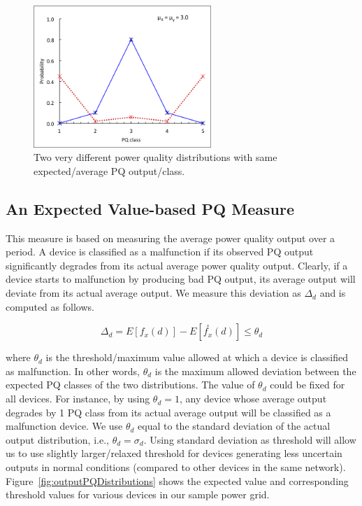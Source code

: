 \begin{figure}[!p]
\centering
\includegraphics[width=0.6\textwidth]{average_pq_exception}
\vspace{1cm}
\caption{Two very different power quality distributions with same expected/average PQ output/class.}
\vspace{2cm}
\label{fig:average_pq_exception}
\end{figure}

\subsection{An Expected Value-based PQ Measure}
This measure is based on measuring the average power quality output over a period. A device is classified as a malfunction if its observed PQ output significantly degrades from its actual average power quality output. Clearly, if a device starts to malfunction by producing bad PQ output, its average output will deviate from its actual average output. We measure this deviation as $\Delta_d$ and is computed as follows.

\[\Delta_d = E[f_x(d)] - E[\overset{\circ}{f_x}(d)] \leq \theta_d \]

\noindent where $\theta_d$ is the threshold/maximum value allowed at which a device is classified as malfunction. In other words, $\theta_d$ is the maximum allowed deviation between the expected PQ classes of the two distributions. The value of $\theta_d$ could be fixed for all devices. For instance, by using $\theta_d = 1$, any device whose average output degrades by 1 PQ class from its actual average output will be classified as a malfunction device. We use $\theta_d$ equal to the standard deviation of the actual output distribution, i.e., $\theta_d=\sigma_d$. Using standard deviation as threshold will allow us to use slightly larger/relaxed threshold for devices generating less uncertain outputs in normal conditions (compared to other devices in the same network). Figure~\ref{fig:outputPQDistributions} shows the expected value and corresponding threshold values for various devices in our sample power grid.

